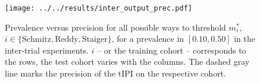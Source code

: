 \begin{figure}
    \centering
    \texttt{[image: ../../results/inter\_output\_prec.pdf]}
    \caption{Prevalence versus precision for all possible ways to threshold $m^*_i$, $i \in 
        \{ \text{Schmitz}, \text{Reddy}, \text{Staiger} \}$, for a prevalence in $[\num{0.10}, 
        \num{0.50}]$ in the inter-trial experiments. $i$ -- or the 
        training cohort -- corresponds to the rows, the test cohort varies with the columns. The 
        dashed gray line marks the precision of the $\text{tIPI}$ on the respective cohort.}
    \label{fig:inter-output-prec}
\end{figure}